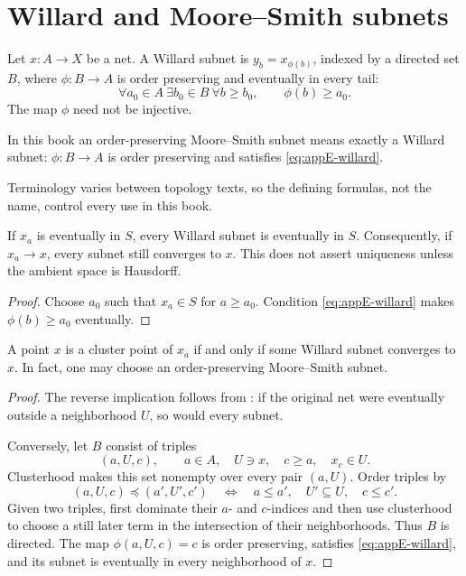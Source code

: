 \section{Willard and Moore--Smith subnets}
\label{sec:appE-subnets}

\begin{definition}
\label{def:appE-willard-subnet}
Let \(x:A\to X\) be a net.
A Willard subnet is \(y_b=x_{\phi(b)}\), indexed by a directed set \(B\),
where \(\phi:B\to A\) is order preserving and eventually in every tail:
\[
 \forall a_0\in A\ \exists b_0\in B\ \forall b\geq b_0,
 \qquad \phi(b)\geq a_0.
\tag{E.3}\label{eq:appE-willard}
\]
The map \(\phi\) need not be injective.
\end{definition}

\begin{definition}
\label{def:appE-ms-subnet}
In this book an order-preserving Moore--Smith subnet means exactly a
Willard subnet: \(\phi:B\to A\) is order preserving and satisfies
\eqref{eq:appE-willard}.
\end{definition}

Terminology varies between topology texts, so the defining formulas, not the
name, control every use in this book.

\begin{lemma}\label{lem:appE-tail-subnet}
If \(x_a\) is eventually in \(S\), every Willard subnet is eventually in
\(S\).
Consequently, if \(x_a\to x\), every subnet still converges to \(x\).
This does not assert uniqueness unless the ambient space is Hausdorff.
\end{lemma}

\begin{proof}
Choose \(a_0\) such that \(x_a\in S\) for \(a\geq a_0\).
Condition \eqref{eq:appE-willard} makes
\(\phi(b)\geq a_0\) eventually.
\end{proof}

\begin{theorem}\label{thm:appE-cluster-subnet}
A point \(x\) is a cluster point of \(x_a\) if and only if some Willard
subnet converges to \(x\).
In fact, one may choose an order-preserving Moore--Smith subnet.
\end{theorem}

\begin{proof}
The reverse implication follows from
: if the original net were eventually
outside a neighborhood \(U\), so would every subnet.

Conversely, let \(B\) consist of triples
\[
 (a,U,c),\qquad a\in A,\quad U\ni x,\quad
 c\geq a,\quad x_c\in U.
\]
Clusterhood makes this set nonempty over every pair \((a,U)\).
Order triples by
\[
 (a,U,c)\preceq(a',U',c')
 \quad\Longleftrightarrow\quad
 a\leq a',\quad U'\subseteq U,\quad c\leq c'.
\]
Given two triples, first dominate their \(a\)- and \(c\)-indices and then use
clusterhood to choose a still later term in the intersection of their
neighborhoods.
Thus \(B\) is directed.
The map \(\phi(a,U,c)=c\) is order preserving, satisfies
\eqref{eq:appE-willard}, and its subnet is eventually in every neighborhood
of \(x\).
\end{proof}

